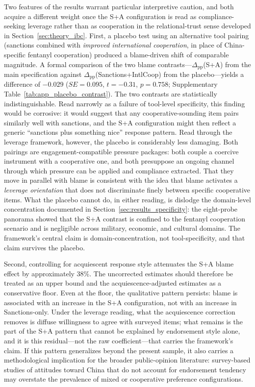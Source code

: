 \documentclass[12pt,letterpaper]{article}
\begin{document}
Two features of the results warrant particular interpretive caution, and both acquire a different weight once the S+A configuration is read as compliance-seeking leverage rather than as cooperation in the relational-trust sense developed in Section~\ref{sec:theory_ibc}. First, a placebo test using an alternative tool pairing (sanctions combined with \emph{improved international cooperation}, in place of China-specific fentanyl cooperation) produced a blame-driven shift of comparable magnitude. A formal comparison of the two blame contrasts---$\Delta_{\text{pp}}$(S+A) from the main specification against $\Delta_{\text{pp}}$(Sanctions+IntlCoop) from the placebo---yields a difference of $-0.029$ ($SE = 0.095$, $t = -0.31$, $p = 0.758$; Supplementary Table~\ref{tab:app_placebo_contrast}). The two contrasts are statistically indistinguishable. Read narrowly as a failure of tool-level specificity, this finding would be corrosive: it would suggest that any cooperative-sounding item pairs similarly well with sanctions, and the S+A configuration might then reflect a generic ``sanctions plus something nice'' response pattern. Read through the leverage framework, however, the placebo is considerably less damaging. Both pairings are engagement-compatible pressure packages: both couple a coercive instrument with a cooperative one, and both presuppose an ongoing channel through which pressure can be applied and compliance extracted. That they move in parallel with blame is consistent with the idea that blame activates a \emph{leverage orientation} that does not discriminate finely between specific cooperative items. What the placebo cannot do, in either reading, is dislodge the domain-level concentration documented in Section~\ref{sec:results_specificity}: the eight-probe panorama showed that the S+A contrast is confined to the fentanyl cooperation scenario and is negligible across military, economic, and cultural domains. The framework's central claim is domain-concentration, not tool-specificity, and that claim survives the placebo.

Second, controlling for acquiescent response style attenuates the S+A blame effect by approximately 38\%. The uncorrected estimates should therefore be treated as an upper bound and the acquiescence-adjusted estimates as a conservative floor. Even at the floor, the qualitative pattern persists: blame is associated with an increase in the S+A configuration, not with an increase in Sanctions-only. Under the leverage reading, what the acquiescence correction removes is diffuse willingness to agree with surveyed items; what remains is the part of the S+A pattern that cannot be explained by endorsement style alone, and it is this residual---not the raw coefficient---that carries the framework's claim. If this pattern generalizes beyond the present sample, it also carries a methodological implication for the broader public-opinion literature: survey-based studies of attitudes toward China that do not account for endorsement tendency may overstate the prevalence of mixed or cooperative preference configurations.
\end{document}
